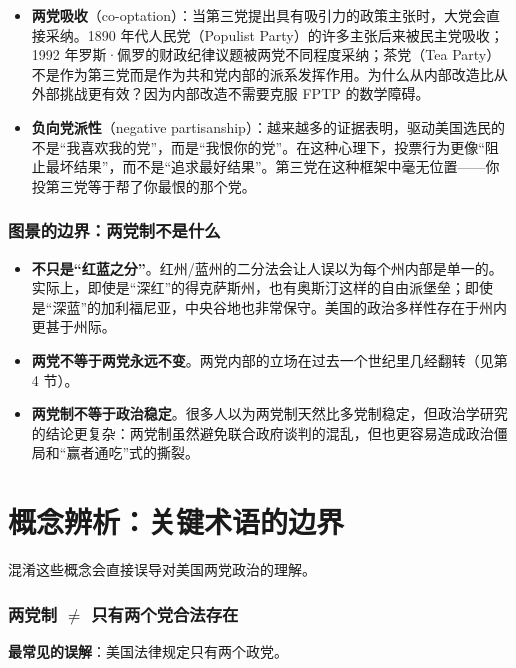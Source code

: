 \documentclass[12pt,a4paper]{ctexart}
\begin{document}
\begin{itemize}
  \item \textbf{两党吸收}（co-optation）：当第三党提出具有吸引力的政策主张时，大党会直接采纳。1890 年代人民党（Populist Party）的许多主张后来被民主党吸收；1992 年罗斯·佩罗的财政纪律议题被两党不同程度采纳；茶党（Tea Party）不是作为第三党而是作为共和党内部的派系发挥作用。为什么从内部改造比从外部挑战更有效？因为内部改造不需要克服 FPTP 的数学障碍。
  \item \textbf{负向党派性}（negative partisanship）：越来越多的证据表明，驱动美国选民的不是``我喜欢我的党''，而是``我恨你的党''。在这种心理下，投票行为更像``阻止最坏结果''，而不是``追求最好结果''。第三党在这种框架中毫无位置——你投第三党等于帮了你最恨的那个党。
\end{itemize}

\section{图景的边界：两党制不是什么}

\begin{itemize}
  \item \textbf{不只是``红蓝之分''}。红州/蓝州的二分法会让人误以为每个州内部是单一的。实际上，即使是``深红''的得克萨斯州，也有奥斯汀这样的自由派堡垒；即使是``深蓝''的加利福尼亚，中央谷地也非常保守。美国的政治多样性存在于州内更甚于州际。
  \item \textbf{两党不等于两党永远不变}。两党内部的立场在过去一个世纪里几经翻转（见第 4 节）。
  \item \textbf{两党制不等于政治稳定}。很多人以为两党制天然比多党制稳定，但政治学研究的结论更复杂：两党制虽然避免联合政府谈判的混乱，但也更容易造成政治僵局和``赢者通吃''式的撕裂。
\end{itemize}

\clearpage

\part{概念辨析：关键术语的边界}

混淆这些概念会直接误导对美国两党政治的理解。

\section{两党制 $\neq$ 只有两个党合法存在}

\textbf{最常见的误解}：美国法律规定只有两个政党。
\end{document}

